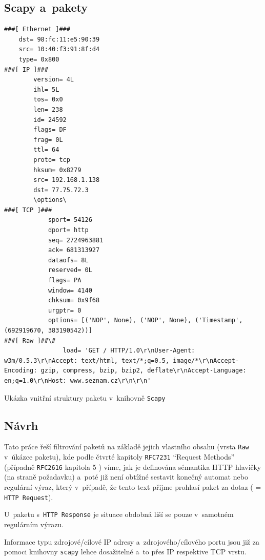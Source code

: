 \documentclass[a4paper, 11pt, titlepage]{article}
\begin{document}
	\subsection{Scapy a~pakety} %
	\label{sub:pakety}

\lstset{tabsize=2, breaklines, frame=single, basicstyle=\small}
\begin{lstlisting} 
###[ Ethernet ]###
	dst= 98:fc:11:e5:90:39
	src= 10:40:f3:91:8f:d4
	type= 0x800
###[ IP ]###
		version= 4L
		ihl= 5L
		tos= 0x0
		len= 238
		id= 24592
		flags= DF
		frag= 0L
		ttl= 64
		proto= tcp
		hksum= 0x8279
		src= 192.168.1.138								
		dst= 77.75.72.3 								
		\options\
###[ TCP ]###
			sport= 54126							
			dport= http 							
			seq= 2724963881
			ack= 681313927
			dataofs= 8L
			reserved= 0L
			flags= PA
			window= 4140
			chksum= 0x9f68
			urgptr= 0
			options= [('NOP', None), ('NOP', None), ('Timestamp', (692919670, 383190542))]
###[ Raw ]##\#										 
				load= 'GET / HTTP/1.0\r\nUser-Agent: w3m/0.5.3\r\nAccept: text/html, text/*;q=0.5, image/*\r\nAccept-Encoding: gzip, compress, bzip, bzip2, deflate\r\nAccept-Language: en;q=1.0\r\nHost: www.seznam.cz\r\n\r\n'
\end{lstlisting}	
	\begin{center} 
		Ukázka vnitřní struktury paketu v~knihovně \texttt{Scapy}
	\end{center}


	\subsection{Návrh} %
	\label{sub:navrh}

	Tato práce řeší filtrování paketů na základě jejich vlastního obsahu (vrsta \texttt{Raw} v~úkázce paketu),
	kde podle čtvrté kapitoly \texttt{RFC7231} \citep{RFC7231} ``Request Methods'' (případně \texttt{RFC2616}  
	kapitola 5 \citep{RFC2616}) víme, jak je definována sémantika HTTP hlavičky (na straně požadavku) a~poté již není obtížné sestavit 
	konečný automat nebo regulární výraz, který v~případě, že tento text přijme prohlasí paket za dotaz ( = \texttt{HTTP Request}). 

	U~paketu s~\texttt{HTTP Response} je situace obdobná liší se pouze v~samotném regulárním výrazu. 

	Informace typu zdrojové/cílové IP adresy a~zdrojového/cílového portu jsou již za pomoci knihovny \texttt{scapy} 
	lehce dosažitelné a~to přes IP respektive TCP vrstu. 
\end{document}
